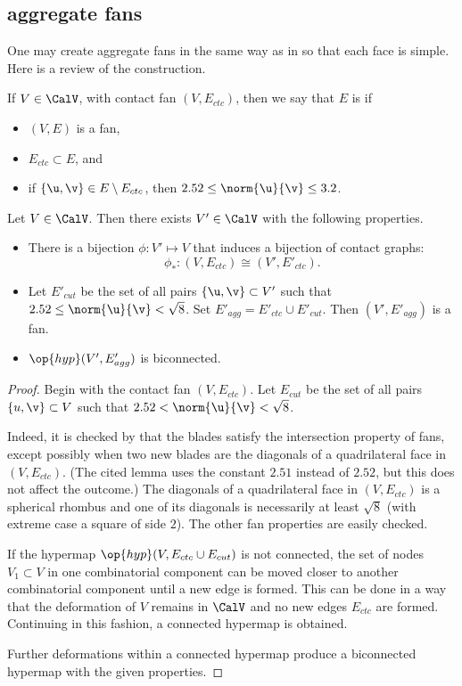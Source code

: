 \subsection{aggregate fans}

One may create aggregate fans in the same way as in
\cite{Hales:2006:DCG} so that each face is simple.  Here is a review
of the construction.  

\begin{definition}
If $V\in\CalV$, with contact fan $(V,E_{ctc})$, then we say that $E$ is  if
\begin{itemize}
\item $(V,E)$ is a fan,
\item $E_{ctc}\subset E$, and
\item if $\{\u,\v\}\in E\setminus E_{ctc}$, then $2.52\le\norm{\u}{\v}\le 3.2$.
\end{itemize}
%
%
\end{definition}

\begin{lemma} Let $V\in \CalV$.  Then there exists  $V'\in \CalV$ with the following
properties.
\begin{itemize}
\item There is a bijection $\phi:V'\mapsto V$ that induces a bijection of contact graphs:
\[
\phi_*:(V,E_{ctc}) \cong (V',E'_{ctc}).
\]
\item Let $E'_{cut}$ be the set of all pairs $\{\u,\v\}\subset V'$ such that $2.52\le\norm{\u}{\v} <\sqrt8$.
Set $E'_{agg} = E'_{ctc}\cup E'_{cut}$.
Then $(V',E'_{agg})$ is a fan.
\item $\op{hyp}(V',E'_{agg})$ is biconnected.
\end{itemize}
\end{lemma}

\begin{proof}
Begin with the contact fan $(V,E_{ctc})$.
Let $E_{cut}$ be the set of all pairs $\{u,\v\}\subset V$ such that $2.52<\norm{\u}{\v}<\sqrt8$.

 Indeed, it is checked by
\cite[Lemma~4.30]{Hales:2006:DCG} that the blades satisfy the
intersection property of fans, except possibly when two new blades are
the diagonals of a quadrilateral face in $(V,E_{ctc})$.  (The cited lemma
uses the constant $2.51$ instead of $2.52$, but this does not affect
the outcome.)  The diagonals of a quadrilateral face in $(V,E_{ctc})$
is a spherical rhombus and one of its diagonals is necessarily at
least $\sqrt8$ (with extreme case a square of side $2$).  The other
fan properties are easily checked.

If the hypermap $\op{hyp}(V,E_{ctc}\cup E_{cut})$ is not connected,
the set of nodes $V_1\subset V$ in one combinatorial component can be
moved closer to another combinatorial component until a new edge is
formed.  This can be done in a way that the deformation of $V$ remains
in $\CalV$ and no new edges $E_{ctc}$ are formed.  Continuing in this
fashion, a connected hypermap is obtained.

Further deformations within a connected hypermap produce a biconnected
hypermap with the given properties.
\end{proof}

